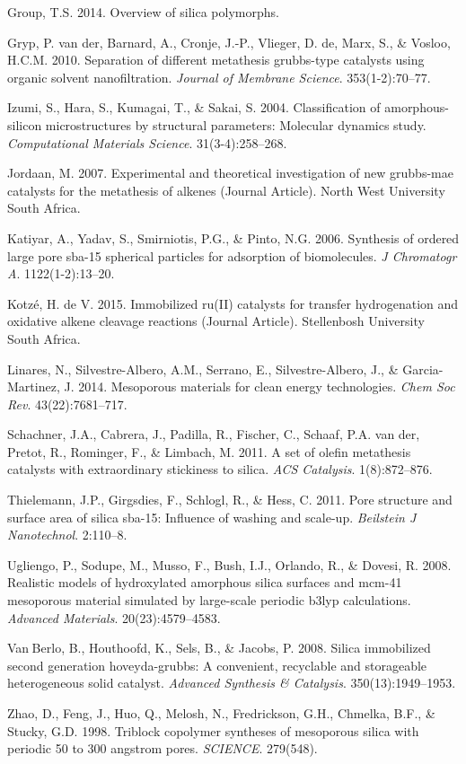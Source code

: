 \documentclass[]{article}
\begin{document}
\leavevmode\hypertarget{ref-Rep1}{}%
Group, T.S. 2014. Overview of silica polymorphs.

\leavevmode\hypertarget{ref-RN73}{}%
Gryp, P. van der, Barnard, A., Cronje, J.-P., Vlieger, D. de, Marx, S.,
\& Vosloo, H.C.M. 2010. Separation of different metathesis grubbs-type
catalysts using organic solvent nanofiltration. \emph{Journal of
Membrane Science}. 353(1-2):70--77.

\leavevmode\hypertarget{ref-RN96}{}%
Izumi, S., Hara, S., Kumagai, T., \& Sakai, S. 2004. Classification of
amorphous-silicon microstructures by structural parameters: Molecular
dynamics study. \emph{Computational Materials Science}.
31(3-4):258--268.

\leavevmode\hypertarget{ref-RN88}{}%
Jordaan, M. 2007. Experimental and theoretical investigation of new
grubbs-mae catalysts for the metathesis of alkenes (Journal Article).
North West University South Africa.

\leavevmode\hypertarget{ref-RN89}{}%
Katiyar, A., Yadav, S., Smirniotis, P.G., \& Pinto, N.G. 2006. Synthesis
of ordered large pore sba-15 spherical particles for adsorption of
biomolecules. \emph{J Chromatogr A}. 1122(1-2):13--20.

\leavevmode\hypertarget{ref-RN90}{}%
Kotzé, H. de V. 2015. Immobilized ru(II) catalysts for transfer
hydrogenation and oxidative alkene cleavage reactions (Journal Article).
Stellenbosh University South Africa.

\leavevmode\hypertarget{ref-RN87}{}%
Linares, N., Silvestre-Albero, A.M., Serrano, E., Silvestre-Albero, J.,
\& Garcia-Martinez, J. 2014. Mesoporous materials for clean energy
technologies. \emph{Chem Soc Rev}. 43(22):7681--717.

\leavevmode\hypertarget{ref-RN85}{}%
Schachner, J.A., Cabrera, J., Padilla, R., Fischer, C., Schaaf, P.A. van
der, Pretot, R., Rominger, F., \& Limbach, M. 2011. A set of olefin
metathesis catalysts with extraordinary stickiness to silica. \emph{ACS
Catalysis}. 1(8):872--876.

\leavevmode\hypertarget{ref-RN92}{}%
Thielemann, J.P., Girgsdies, F., Schlogl, R., \& Hess, C. 2011. Pore
structure and surface area of silica sba-15: Influence of washing and
scale-up. \emph{Beilstein J Nanotechnol}. 2:110--8.

\leavevmode\hypertarget{ref-RN13}{}%
Ugliengo, P., Sodupe, M., Musso, F., Bush, I.J., Orlando, R., \& Dovesi,
R. 2008. Realistic models of hydroxylated amorphous silica surfaces and
mcm-41 mesoporous material simulated by large-scale periodic b3lyp
calculations. \emph{Advanced Materials}. 20(23):4579--4583.

\leavevmode\hypertarget{ref-RN74}{}%
Van Berlo, B., Houthoofd, K., Sels, B., \& Jacobs, P. 2008. Silica
immobilized second generation hoveyda-grubbs: A convenient, recyclable
and storageable heterogeneous solid catalyst. \emph{Advanced Synthesis
\& Catalysis}. 350(13):1949--1953.

\leavevmode\hypertarget{ref-RN69}{}%
Zhao, D., Feng, J., Huo, Q., Melosh, N., Fredrickson, G.H., Chmelka,
B.F., \& Stucky, G.D. 1998. Triblock copolymer syntheses of mesoporous
silica with periodic 50 to 300 angstrom pores. \emph{SCIENCE}. 279(548).
\end{document}

